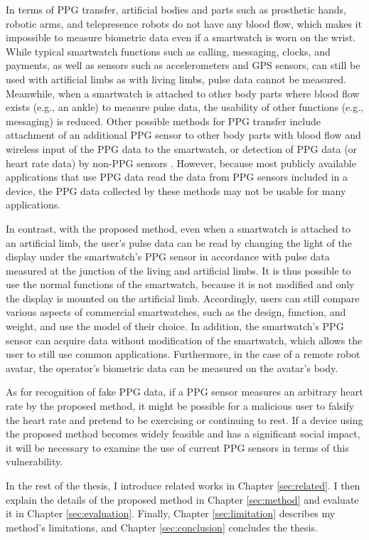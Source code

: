 In terms of PPG transfer, artificial bodies and parts such as prosthetic hands, robotic arms, and telepresence robots do not have any blood flow, which makes it impossible to measure biometric data even if a smartwatch is worn on the wrist. While typical smartwatch functions such as calling, messaging, clocks, and payments, as well as sensors such as accelerometers and GPS sensors, can still be used with artificial limbs as with living limbs, pulse data cannot be measured. Meanwhile, when a smartwatch is attached to other body parts where blood flow exists (e.g., an ankle) to measure pulse data, the usability of other functions (e.g., messaging) is reduced. Other possible methods for PPG transfer include attachment of an additional PPG sensor to other body parts with blood flow and wireless input of the PPG data to the smartwatch, or detection of PPG data (or heart rate data) by non-PPG sensors \cite{heart_rate_accelerometer, Biowatch, SeismoTracker, heart_rate_ecg, heart_rate_touchscreen}. However, because most publicly available applications that use PPG data read the data from PPG sensors included in a device, the PPG data collected by these methods may not be usable for many applications.\par

In contrast, with the proposed method, even when a smartwatch is attached to an artificial limb, the user's pulse data can be read by changing the light of the display under the smartwatch's PPG sensor in accordance with pulse data measured at the junction of the living and artificial limbs. It is thus possible to use the normal functions of the smartwatch, because it is not modified and only the display is mounted on the artificial limb. Accordingly, users can still compare various aspects of commercial smartwatches, such as the design, function, and weight, and use the model of their choice. In addition, the smartwatch's PPG sensor can acquire data without modification of the smartwatch, which allows the user to still use common applications. Furthermore, in the case of a remote robot avatar, the operator's biometric data can be measured on the avatar's body.\par

As for recognition of fake PPG data, if a PPG sensor measures an arbitrary heart rate by the proposed method, it might be possible for a malicious user to falsify the heart rate and pretend to be exercising or continuing to rest. If a device using the proposed method becomes widely feasible and has a significant social impact, it will be necessary to examine the use of current PPG sensors in terms of this vulnerability.\par

In the rest of the thesis, I introduce related works in Chapter \ref{sec:related}. I then explain the details of the proposed method in Chapter \ref{sec:method} and evaluate it in Chapter \ref{sec:evaluation}. Finally, Chapter \ref{sec:limitation} describes my method's limitations, and Chapter \ref{sec:conclusion} concludes the thesis.
